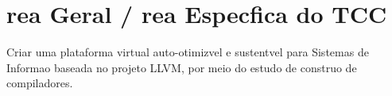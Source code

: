 \chapter{\AH rea Geral / \AH rea Espec\ih fica do TCC}
\label{pro:area}

Criar uma plataforma virtual auto-otimiz\ah vel e sustent\ah vel para Sistemas de Informa\ca o baseada no projeto LLVM, por meio do estudo de constru\ca o de compiladores.
